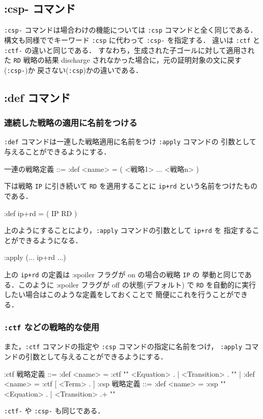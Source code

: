 \documentclass[a4paper,oneside,10pt,here]{memoir}
\newenvironment{vvtm}%
{\parskip=0pt\lineskip=0pt\begin{center}\begin{minipage}{0.8\textwidth}\begin{snugshade}}%
  {\end{snugshade}\end{minipage}\end{center}}
\begin{document}
\subsection{:csp- コマンド}\label{sec:csp-}
\texttt{:csp-} コマンドは場合わけの機能については \texttt{:csp} コマンドと全く同じである．
構文も同様ででキーワード \texttt{:csp} に代わって \texttt{:csp-} を指定する．
違いは \texttt{:ctf} と \texttt{:ctf-} の違いと同じである．
すなわち，生成された子ゴールに対して適用された \texttt{RD} 戦略の結果
discharge されなかった場合に，元の証明対象の文に戻す(\texttt{:csp-})か
戻さない(\texttt{:csp})かの違いである．

\subsection{:def コマンド}\label{sec:def-command}
\subsubsection{連続した戦略の適用に名前をつける}
\texttt{:def} コマンドは一連した戦略適用に名前をつけ \texttt{:apply} コマンドの
引数として与えることができるようにする．
  \begin{vvtm}
    \begin{simplev}
    一連の戦略定義 ::= :def <name> = ( <戦略1> ... <戦略n> )
  \end{simplev}
  \end{vvtm}

下は戦略 \texttt{IP} に引き続いて \texttt{RD} を適用することに
\texttt{ip+rd} という名前をつけたものである．
\begin{examplev}
  :def ip+rd = ( IP RD )
\end{examplev}
上のようにすることにより，\texttt{:apply} コマンドの引数として \texttt{ip+rd} を
指定することができるようになる．
\begin{examplev}
  :apply (... ip+rd ...)
\end{examplev}
上の \texttt{ip+rd} の定義は :spoiler フラグが on の場合の戦略 \texttt{IP} の
挙動と同じである．このように :spoiler フラグが off の状態(デフォルト) で
\texttt{RD} を自動的に実行したい場合はこのような定義をしておくことで
簡便にこれを行うことができる．

\subsubsection{\texttt{:ctf} などの戦略的な使用}
また，\texttt{:ctf} コマンドの指定や \texttt{:csp} コマンドの指定に名前をつけ，
\texttt{:apply} コマンドの引数として与えることができるようにする．
  \begin{vvtm}
   \begin{simplev}
:ctf 戦略定義 ::= :def <name> = :ctf "{" { <Equation> . | <Transition> . } "}"
              |   :def <name> = :ctf [ <Term> . ]
:csp 戦略定義 ::= :def <name> = :csp "{" { <Equation> . | <Transition> .}+ "}"
  \end{simplev}
  \end{vvtm}
\texttt{:ctf-} や \texttt{:csp-} も同じである．
\end{document}
